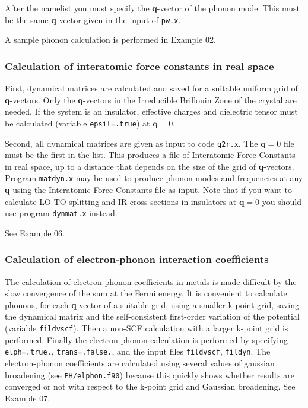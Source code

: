 \documentclass[12pt,a4paper]{article}
\begin{document}
After the namelist you must specify the \textbf{q}-vector of the
phonon mode.
This must be the same \textbf{q}-vector given in the input of
\texttt{pw.x}.

A sample phonon calculation is performed in Example 02.

\subsubsection{Calculation of interatomic force constants in real
space}

First, dynamical matrices are calculated and saved for a suitable
uniform grid of \textbf{q}-vectors.
Only the \textbf{q}-vectors in the Irreducible Brillouin Zone of the
crystal are needed.
If the system is an insulator, effective charges and dielectric tensor
must be calculated (variable \texttt{epsil=.true}) at $\mathbf{q}=0$.

Second, all dynamical matrices are given as input to code
\texttt{q2r.x}.
The $\mathbf{q}=0$ file must be the first in the list.
This produces a file of Interatomic Force Constants in real space, up
to a distance that depends on the size of the grid of
\textbf{q}-vectors.
Program \texttt{matdyn.x} may be used to produce phonon modes and
frequencies at any \textbf{q} using the Interatomic Force Constants
file as input.
Note that if you want to calculate LO-TO splitting and IR cross
sections in insulators at $\mathbf{q}=0$ you should use program
\texttt{dynmat.x} instead.

See Example 06.

\subsubsection{Calculation of electron-phonon interaction
coefficients}

The calculation of electron-phonon coefficients in metals is made
difficult by the slow convergence of the sum at the Fermi energy.
It is convenient to calculate phonons, for each \textbf{q}-vector of a
suitable grid, using a smaller k-point grid, saving the dynamical
matrix and the self-consistent first-order variation of the potential
(variable \texttt{fildvscf}).
Then a non-SCF calculation with a larger k-point grid is performed.
Finally the electron-phonon calculation is performed by specifying
\texttt{elph=.true.}, \texttt{trans=.false.}, and the input files
\texttt{fildvscf}, \texttt{fildyn}.
The electron-phonon coefficients are calculated using several values
of gaussian broadening (see \texttt{PH/elphon.f90}) because this
quickly shows whether results are converged or not with respect to the
k-point grid and Gaussian broadening. See Example 07.
\end{document}
